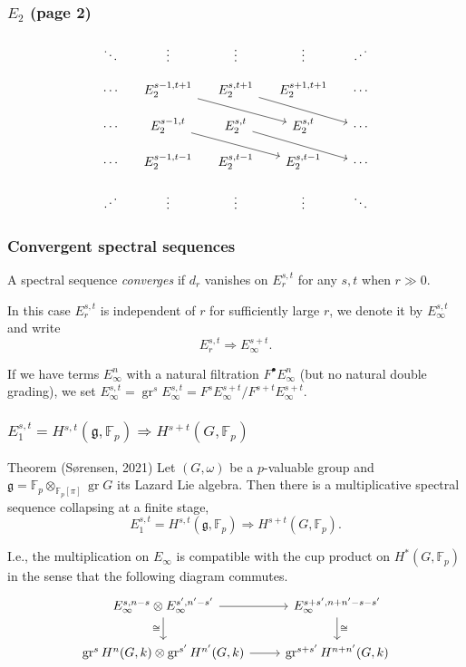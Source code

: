 \documentclass{beamer}
\newcommand*\F{\mathbb{F}}
\DeclareMathOperator{\gr}{gr} %
\newcommand*{\lie}[1]{\mathfrak{#1}} %
\newcommand*\iso{\cong} %
\begin{document}

\begin{frame}[fragile]
  \frametitle{$E_2$ (page 2)}

  \[
    \begin{tikzcd}[column sep=small,row sep=small]
      \ddots & \vdots & \vdots & \vdots & \reflectbox{$\ddots$} \\
      \cdots & E_2^{s-1,t+1} \ar[drr] & E_2^{s,t+1} \ar[drr] & E_2^{s+1,t+1}  & \cdots \\
      \cdots & E_2^{s-1,t} \ar[drr] & E_2^{s,t} \ar[drr] & E_2^{s,t} & \cdots \\
      \cdots & E_2^{s-1,t-1}  & E_2^{s,t-1}  & E_2^{s,t-1} & \cdots \\
      \reflectbox{$\ddots$} & \vdots & \vdots & \vdots & \ddots
    \end{tikzcd}
  \]
\end{frame}


\begin{frame}[fragile]
  \frametitle{Convergent spectral sequences}

  A spectral sequence \emph{converges} if $d_r$ vanishes on $E_r^{s,t}$ for any $s,t$ when $r\gg0$.

  In this case $E_r^{s,t}$ is independent of $r$ for sufficiently large $r$, we denote it by $E_\infty^{s,t}$ and write
  \[
    E_{r}^{s,t} \Longrightarrow E_\infty^{s+t}.
  \]

  If we have terms $E_\infty^{n}$  with a natural filtration $F^\bullet E_\infty^n$ (but no natural double grading), we set $E_\infty^{s,t} = \gr^{s} E_\infty^{s,t}= F^sE_\infty^{s+t}/F^{s+t}E_\infty^{s+t}$.
\end{frame}


\begin{frame}[fragile]
  \frametitle{$E_1^{s,t} = H^{s,t}(\lie{g},\F_p) \Longrightarrow H^{s+t}(G,\F_p)$}

  \begin{block}{Theorem (Sørensen, 2021)}
    Let $(G,\omega)$ be a $p$-valuable group and $\lie{g} = \F_{p} \otimes_{\F_{p}[\pi]} \gr G$ its Lazard Lie algebra. Then there is a multiplicative spectral sequence collapsing at a finite stage,
    \[
      E_1^{s,t} = H^{s,t}(\lie{g},\F_{p}) \Longrightarrow H^{s+t}(G,\F_{p}).
    \]
  \end{block}
  \pause

  I.e., the multiplication on $E_{\infty}$ is compatible with the cup product on $H^{*}(G,\F_{p})$ in the sense that the following diagram commutes.
  \[
    \begin{tikzcd}
      E_\infty^{s,n-s} \otimes E_\infty^{s',n'-s'} \ar[r] \ar[d,swap,"\iso"] & E_\infty^{s+s',n+n'-s-s'} \ar[d,"\iso"] \\
      \gr^s H^n(G,k) \otimes \gr^{s'} H^{n'}(G,k) \ar[r] & \gr^{s+s'}H^{n+n'}(G,k)
    \end{tikzcd}
  \]
\end{frame}
\end{document}
